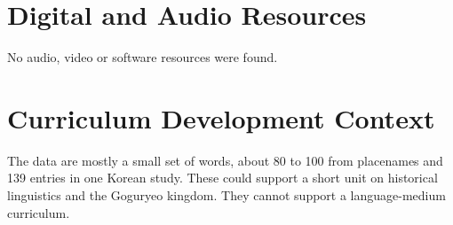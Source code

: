 \documentclass[12pt]{article}
\begin{document}
\section{Digital and Audio Resources}
No audio, video or software resources were found.

\section{Curriculum Development Context}
The data are mostly a small set of words, about 80 to 100 from placenames and 139 entries in one Korean study. These could support a short unit on historical linguistics and the Goguryeo kingdom. They cannot support a language-medium curriculum.
\end{document}
